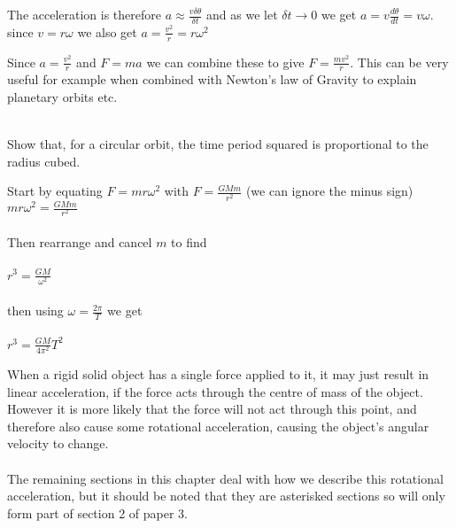\documentclass[revision-guide.tex]{subfiles}
\begin{document}
The acceleration is therefore $a\approx\frac{v\delta\theta}{\delta t}$ and as we let $\delta t\rightarrow0$ we get $a=v\frac{d\theta}{dt}=v\omega$.
\\
since $v=r\omega$ we also get $a=\frac{v^2}{r}=r\omega^2$




Since $a = \frac{v ^{2}}{r}$ and $F=ma$ we can combine these to give $F=\frac{mv^2}{r}$. This can be very useful for example when combined with Newton's law of Gravity to explain planetary orbits etc.
\\
\\

\begin{example}
	Show that, for a circular orbit, the time period squared is proportional to the radius cubed.

 	\answer Start by equating $F=mr\omega^2$ with $F= \frac{GMm}{r^2}$ (we can ignore the minus sign)
\\

$mr\omega^{2}= \frac{GMm}{r^2}$
\\
\\
Then rearrange and cancel $m$ to find
\\
\\
$r^{3}=\frac{GM}{\omega^2}$
\\
\\
then using $\omega=\frac{2\pi}{T}$ we get
\\
\\
$r^{3}=\frac{GM}{4\pi^{2}}T^2$

\end{example}


When a rigid solid object has a single force applied to it, it may just result in linear acceleration, if the force acts through the centre of mass of the object. However it is more likely that the force will not act through this point, and therefore also cause some rotational acceleration, causing the object's angular velocity to change.
\\
\\
The remaining sections in this chapter deal with how we describe this rotational acceleration, but it should be noted that they are asterisked sections so will only form part of section 2 of paper 3.
\end{document}
